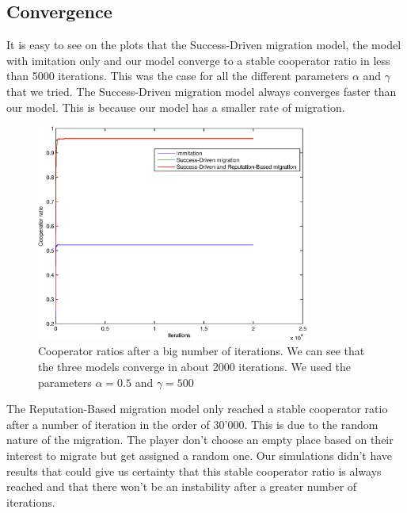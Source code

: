 \documentclass[11pt]{article}
\begin{document}
\subsection{Convergence}
It is easy to see on the plots that the Success-Driven migration model, the model with imitation only and our model converge to a stable cooperator ratio in less than 5000 iterations. This was the case for all the different parameters $\alpha$ and $\gamma$ that we tried.
The Success-Driven migration model always converges faster than our model. This is because our model has a smaller rate of migration.
\begin{figure}[h]
	\centering
        \includegraphics[width=0.8\textwidth]{../../other/plots/convergence-20000.eps}
	\caption{Cooperator ratios after a big number of iterations. We can see that the three models converge in about 2000 iterations. We used the parameters $\alpha = 0.5$ and $\gamma = 500$}
\end{figure}

The Reputation-Based migration model only reached a stable cooperator ratio after a number of iteration in the order of 30'000. This is due to the random nature of the migration. The player don't choose an empty place based on their interest to migrate but get assigned a random one. Our simulations didn't have results that could give us certainty that this stable cooperator ratio is always reached and that there won't be an instability after a greater number of iterations.
\end{document}

